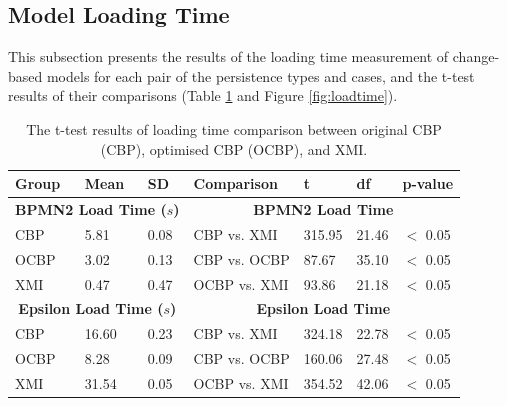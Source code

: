 \documentclass{llncs}
\begin{document}
\vspace{-10pt}
\subsection{Model Loading Time}
\label{subsec:loading_time_test}

\vspace{-10pt}
 This subsection presents the results of the loading time measurement of change-based models for each pair of the persistence types and cases, and the t-test results of their comparisons (Table \ref{table:ttest_results_loadtime} and Figure \ref{fig:loadtime}). 
 
 \vspace{-20pt}
 \begin{table}[ht]
     \footnotesize
     \centering
     \caption{The t-test results of loading time comparison between original CBP (CBP), optimised CBP (OCBP), and XMI.}
     \label{table:ttest_results_loadtime}
     \begin{tabular}
         {|p{}p{}p{}|p{}p{}p{}p{}|}
         \hline 
         Group & Mean & SD & Comparison & t  & df & p-value \\  
         \hline 
         \multicolumn{3}{|c|}{\textbf{BPMN2 Load Time ($s$)}} & \multicolumn{4}{c|}{\textbf{BPMN2 Load Time}} \\ 
         CBP & 5.81 & 0.08 & CBP vs. XMI & 315.95    &21.46 & $<$ 0.05 \\  
         OCBP & 3.02 & 0.13 & CBP vs. OCBP & 87.67 & 35.10  & $<$ 0.05 \\  
         XMI & 0.47 & 0.47 & OCBP vs. XMI & 93.86    & 21.18  & $<$ 0.05 \\ 
         \hline 
         
         \multicolumn{3}{|c|}{\textbf{Epsilon Load Time ($s$)}} & \multicolumn{4}{c|}{\textbf{Epsilon Load Time}} \\
         CBP & 16.60    & 0.23 &  CBP vs. XMI & 324.18   &22.78 & $<$ 0.05 \\
         OCBP &  8.28  &  0.09 & CBP vs. OCBP & 160.06 & 27.48 & $<$ 0.05 \\  
         XMI & 31.54   & 0.05 & OCBP vs. XMI & 354.52   &42.06  & $<$ 0.05 \\ 
         \hline 
         

\end{tabular}
\end{table}
\end{document}

